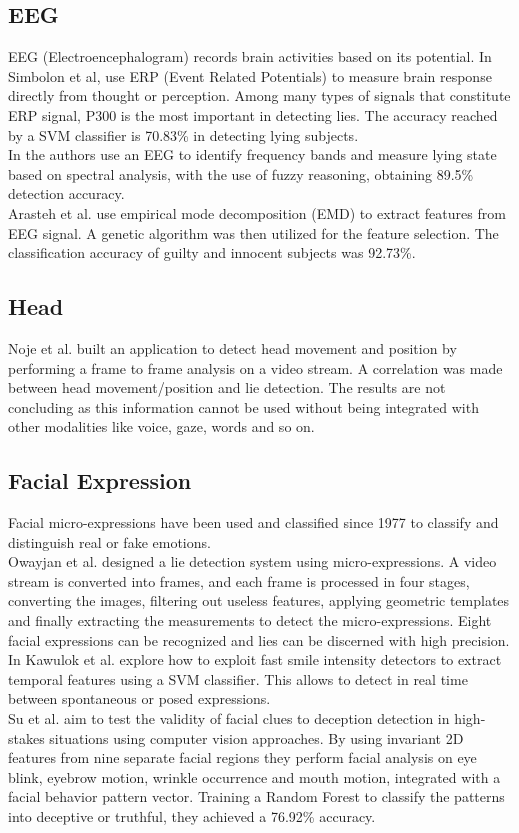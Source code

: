 \documentclass[LaM,binding=0.6cm,english,noexaminfo]{sapthesis}
\begin{document}
\subsection*{EEG}
EEG (Electroencephalogram) records brain activities based on its potential. In \cite{7440177}  Simbolon et al, use ERP (Event Related Potentials) to measure brain response directly from thought or perception. Among many types of signals that constitute ERP signal, P300 is the most important in detecting lies. The accuracy reached by a SVM classifier is 70.83\% in detecting lying subjects.\\
In \cite{Lai2017} the authors use an EEG to identify frequency bands and measure lying state based on spectral analysis, with the use of fuzzy reasoning, obtaining 89.5\% detection accuracy. \\
Arasteh et al. \cite{7511728} use empirical mode decomposition (EMD) to extract features from EEG signal. A genetic algorithm was then utilized for the feature selection. The classification accuracy of guilty and innocent subjects was 92.73\%.

\subsection*{Head}
Noje et al. \cite{7367432} built an application to detect head movement and position by performing a frame to frame analysis on a video stream. A correlation was made between head movement/position and lie detection. The results are not concluding as this information cannot be used without being integrated with other modalities like voice, gaze, words and so on.

\subsection*{Facial Expression}
Facial micro-expressions have been used and classified since 1977 \cite{ekman} to classify and distinguish real or fake emotions. \\
Owayjan et al. \cite{6462897} designed a lie detection system using micro-expressions. A video stream is converted into frames, and each frame is processed in four stages, converting the images, filtering out useless features, applying geometric templates and finally extracting the measurements to detect the micro-expressions. Eight facial expressions can be recognized and lies can be discerned with high precision. \\
In \cite{10.1007/978-3-319-47955-2_27} Kawulok et al. explore how to exploit fast smile intensity detectors to extract temporal features using a SVM classifier. This allows to detect in real time between spontaneous or posed expressions. \\
Su et al. \cite{SU201652} aim to test the validity of facial clues to deception detection in high-stakes situations using computer vision approaches. By using invariant 2D features from nine separate facial regions they perform facial analysis on eye blink, eyebrow motion, wrinkle occurrence and mouth motion, integrated with a facial behavior pattern vector. Training a Random Forest to classify the patterns into deceptive or truthful, they achieved a 76.92\% accuracy.
\end{document}
